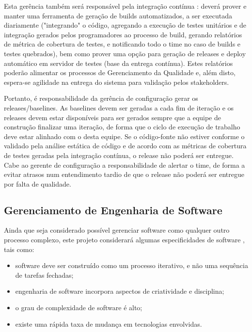 \documentclass[12pt,journal,compsoc]{IEEEtran}
\begin{document}
Esta gerência também será responsável pela integração contínua
\cite{fowler_ci_2006}: deverá prover e manter uma ferramenta de geração de
builds automatizados, a ser executada diariamente ("integrando" o código,
agregando a execução de testes unitários e de integração gerados pelos
programadores ao processo de build, gerando relatórios de métrica de cobertura
de testes, e notificando todo o time no caso de builds e testes quebrados), bem
como prover uma opção para geração de releases e deploy automático em servidor
de testes (base da entrega contínua). Estes relatórios poderão alimentar os
processos de Gerenciamento da Qualidade \cite{society_software_2004} e, além
disto, espera-se agilidade na entrega do sistema para validação pelos
stakeholders. 

Portanto, é responsabilidade da gerência de configuração gerar os releases/baselines. As baselines devem ser geradas a cada fim de iteração e os releases devem estar disponíveis para ser gerados sempre que a equipe de construção finalizar uma iteração, de forma que o ciclo de execução de trabalho deve estar alinhado com o desta equipe. Se o código-fonte não estiver conforme o validado pela análise estática de código e de acordo com as métricas de cobertura de testes geradas pela integração contínua, o release não poderá ser entregue. Cabe ao gerente de configuração a responsabilidade de alertar o time, de forma a evitar atrasos num entendimento tardio de que o release não poderá ser entregue por falta de qualidade.


\subsection{Gerenciamento de Engenharia de Software}

Ainda que seja considerado possível gerenciar software como qualquer outro processo complexo, este projeto considerará algumas especificidades de software \cite{society_software_2004}, tais como: 

\begin{itemize}
\item software deve ser construído como um processo iterativo, e não uma sequência de tarefas fechadas;
\item engenharia de software incorpora aspectos de criatividade e disciplina;
\item o grau de complexidade de software é alto;
\item existe uma rápida taxa de mudança em tecnologias envolvidas. 
\end{itemize}
\end{document}
